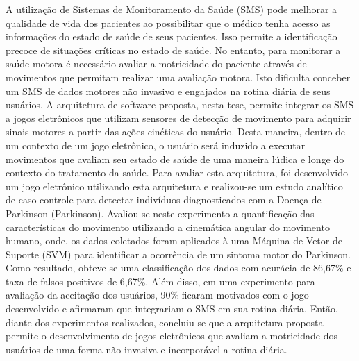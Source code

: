 A utilização de Sistemas de Monitoramento da Saúde (SMS) pode melhorar a qualidade de vida dos pacientes ao possibilitar que o médico tenha acesso as informações do estado de saúde de seus pacientes. Isso permite a identificação precoce de situações críticas no estado de saúde.
No entanto, para monitorar a saúde motora é necessário avaliar a motricidade do paciente através de movimentos que permitam realizar uma avaliação motora.  Isto dificulta conceber um SMS de dados motores não invasivo e engajados na rotina diária de seus usuários. A arquitetura de software proposta, nesta tese, permite integrar os SMS a jogos eletrônicos que utilizam sensores de detecção de movimento para adquirir sinais motores a partir das ações cinéticas do usuário. Desta maneira, dentro de um contexto de um jogo eletrônico, o usuário será induzido a executar movimentos que avaliam seu estado de saúde de uma maneira lúdica e longe do contexto do tratamento da saúde. Para avaliar esta arquitetura, foi desenvolvido um jogo eletrônico utilizando esta arquitetura e realizou-se um estudo analítico de caso-controle para detectar indivíduos diagnosticados com a Doença de Parkinson (Parkinson). Avaliou-se neste experimento a quantificação das características do movimento utilizando a cinemática angular do movimento humano, onde, os dados coletados foram aplicados à uma Máquina de Vetor de Suporte (SVM) para identificar a ocorrência de um sintoma motor do Parkinson. Como resultado, obteve-se uma classificação dos dados com acurácia de 86,67\% e taxa de falsos positivos de 6,67\%. Além disso, em uma experimento para avaliação da aceitação dos usuários, 90\% ficaram motivados com o jogo desenvolvido e afirmaram que integrariam o SMS em sua rotina diária. Então, diante dos experimentos realizados, concluiu-se que a arquitetura proposta permite o desenvolvimento de jogos eletrônicos que avaliam a motricidade dos usuários de uma forma não invasiva e incorporável a rotina diária. 



